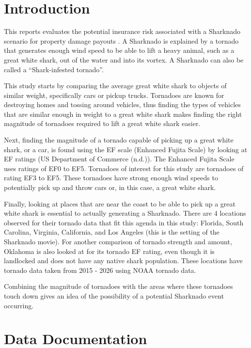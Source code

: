 \documentclass[
  letterpaper,
  DIV=11,
  numbers=noendperiod]{scrreprt}
\begin{document}
\chapter{Introduction}\label{introduction}

This reports evaluates the potential insurance risk associated with a
Sharknado scenario for property damage payouts . A Sharknado is
explained by a tornado that generates enough wind speed to be able to
lift a heavy animal, such as a great white shark, out of the water and
into its vortex. A Sharknado can also be called a ``Shark-infested
tornado''.

This study starts by comparing the average great white shark to objects
of similar weight, specifically cars or pickup trucks. Tornadoes are
known for destroying homes and tossing around vehicles, thus finding the
types of vehicles that are similar enough in weight to a great white
shark makes finding the right magnitude of tornadoes required to lift a
great white shark easier.

Next, finding the magnitude of a tornado capable of picking up a great
white shark, or a car, is found using the EF scale (Enhanced Fujita
Scale) by looking at EF ratings (US Department of Commerce (n.d.)). The
Enhanced Fujita Scale uses ratings of EF0 to EF5. Tornadoes of interest
for this study are tornadoes of rating EF3 to EF5. These tornadoes have
strong enough wind speeds to potentially pick up and throw cars or, in
this case, a great white shark.

Finally, looking at places that are near the coast to be able to pick up
a great white shark is essential to actually generating a Sharknado.
There are 4 locations observed for their tornado data that fit this
agenda in this study: Florida, South Carolina, Virginia, California, and
Los Angeles (this is the setting of the Sharknado movie). For another
comparison of tornado strength and amount, Oklahoma is also looked at
for its tornado EF rating, even though it is landlocked and does not
have any native shark population. These locations have tornado data
taken from 2015 - 2026 using NOAA tornado data.

Combining the magnitude of tornadoes with the areas where these
tornadoes touch down gives an idea of the possibility of a potential
Sharknado event occurring.


\chapter{Data Documentation}\label{data-documentation}
\end{document}
